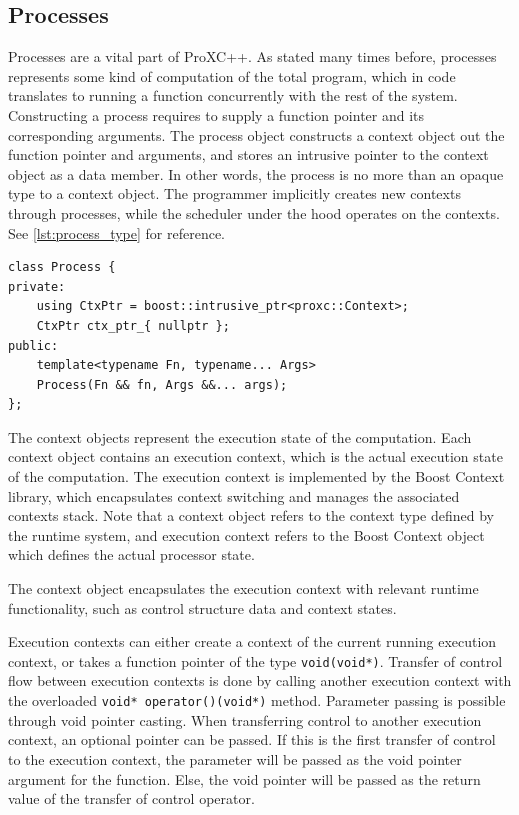 \subsection{Processes}
\label{subsec:process_implementation}


Processes are a vital part of ProXC++. As stated many times before, processes represents some kind of computation of the total program, which in code translates to running a function concurrently with the rest of the system. Constructing a process requires to supply a function pointer and its corresponding arguments. The process object constructs a context object out the function pointer and arguments, and stores an intrusive pointer to the context object as a data member. In other words, the process is no more than an opaque type to a context object. The programmer implicitly creates new contexts through processes, while the scheduler under the hood operates on the contexts. See \cref{lst:process_type} for reference.

\begin{lstfloat}
\begin{lstlisting}[caption={Minimal process type.}, label={lst:process_type}, style={CustomC++}, xleftmargin={4em}]
class Process {
private:
    using CtxPtr = boost::intrusive_ptr<proxc::Context>;
    CtxPtr ctx_ptr_{ nullptr };
public:
    template<typename Fn, typename... Args>
    Process(Fn && fn, Args &&... args);
};
\end{lstlisting}
\end{lstfloat}

The context objects represent the execution state of the computation. Each context object contains an execution context, which is the actual execution state of the computation. The execution context is implemented by the Boost Context library, which encapsulates context switching and manages the associated contexts stack. Note that a context object refers to the context type defined by the runtime system, and execution context refers to the Boost Context object which defines the actual processor state.

The context object encapsulates the execution context with relevant runtime functionality, such as control structure data and context states.

Execution contexts can either create a context of the current running execution context, or takes a function pointer of the type \lstinline[style={CustomC++}]|void(void*)|. Transfer of control flow between execution contexts is done by calling another execution context with the overloaded \lstinline[style={CustomC++}]|void* operator()(void*)| method. Parameter passing is possible through void pointer casting. When transferring control to another execution context, an optional pointer can be passed. If this is the first transfer of control to the execution context, the parameter will be passed as the void pointer argument for the function. Else, the void pointer will be passed as the return value of the transfer of control operator.

